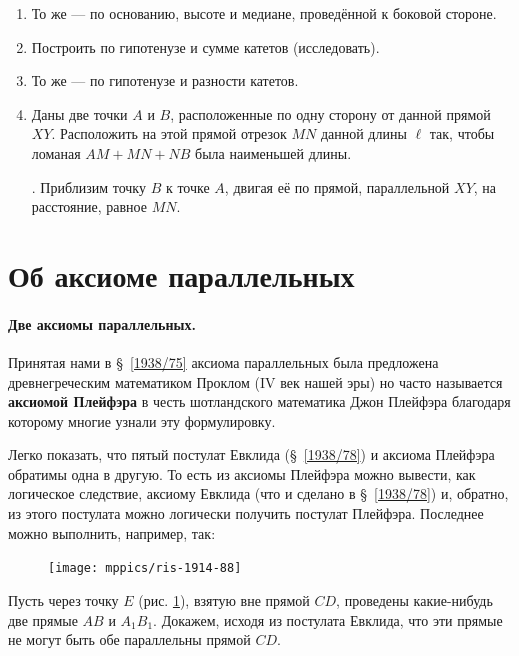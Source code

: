 \documentclass[twoside]{book}
\makeatletter
\newcommand{\rindex}[2][\imki@jobname]{%
  \index[#1]{\detokenize{#2}}%
}
\makeatother
\begin{document}
\begin{enumerate}[resume]
 \item
То же — по основанию, высоте и медиане, проведённой к боковой стороне.

 \item
Построить  по гипотенузе и сумме катетов (исследовать).

 \item
То же — по гипотенузе и разности катетов.

 \item
Даны две точки $A$ и $B$, расположенные по одну сторону от данной прямой $XY$.
Расположить на этой прямой отрезок $MN$ данной длины $\ell$ так, чтобы ломаная $AM+MN+NB$ была наименьшей длины.

\smallskip
{}.
Приблизим точку $B$ к точке $A$, двигая её по прямой, параллельной $XY$, на расстояние, равное $MN$.

\end{enumerate}


\section{Об аксиоме параллельных}

\paragraph{Две аксиомы параллельных.}\label{1914/91} 
Принятая нами в §~\ref{1938/75} аксиома параллельных была предложена древнегреческим математиком Проклом (IV век нашей эры) но часто называется \rindex{аксиома Плейфэра}\textbf{аксиомой Плейфэра} в честь шотландского математика Джон Плейфэра благодаря которому многие узнали эту формулировку.  

Легко показать, что пятый постулат Евклида (§~\ref{1938/78}) и аксиома Плейфэра обратимы одна в другую. 
То есть из аксиомы Плейфэра можно вывести, как логическое следствие, аксиому Евклида (что и сделано в §~\ref{1938/78}) и, обратно, из этого постулата можно логически получить постулат Плейфэра.
Последнее можно выполнить, например, так:

\begin{figure}
\centering
\texttt{[image: mppics/ris-1914-88]}
\caption{}\label{1914/ris-88}
\end{figure}

Пусть через точку $E$ (рис. \ref{1914/ris-88}), взятую вне прямой $CD$, проведены какие-нибудь две прямые $AB$ и $A_1B_1$.
Докажем, исходя из постулата Евклида, что эти прямые не могут быть обе параллельны прямой $CD$.
\end{document}
